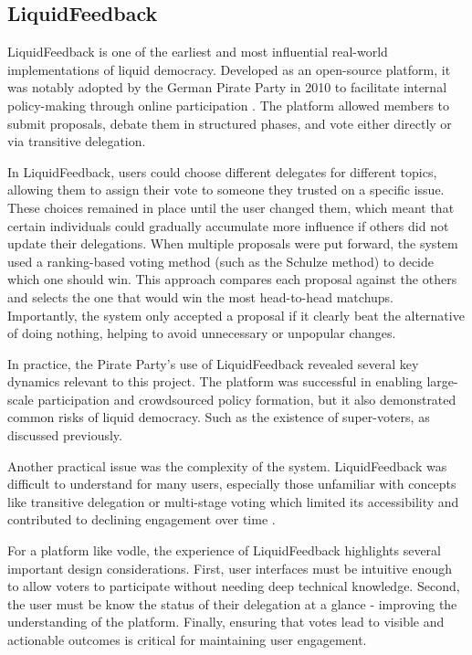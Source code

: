 \subsection{LiquidFeedback}
LiquidFeedback is one of the earliest and most influential real-world implementations of liquid democracy. Developed as an open-source platform, it was notably adopted by the German Pirate Party in 2010 to facilitate internal policy-making through online participation \citep{behrens_liquidfeedback_2014}. The platform allowed members to submit proposals, debate them in structured phases, and vote either directly or via transitive delegation.

In LiquidFeedback, users could choose different delegates for different topics, allowing them to assign their vote to someone they trusted on a specific issue. These choices remained in place until the user changed them, which meant that certain individuals could gradually accumulate more influence if others did not update their delegations. When multiple proposals were put forward, the system used a ranking-based voting method (such as the Schulze method) to decide which one should win. This approach compares each proposal against the others and selects the one that would win the most head-to-head matchups. Importantly, the system only accepted a proposal if it clearly beat the alternative of doing nothing, helping to avoid unnecessary or unpopular changes.

In practice, the Pirate Party's use of LiquidFeedback revealed several key dynamics relevant to this project. The platform was successful in enabling large-scale participation and crowdsourced policy formation, but it also demonstrated common risks of liquid democracy. Such as the existence of super-voters, as discussed previously.

Another practical issue was the complexity of the system. LiquidFeedback was difficult to understand for many users, especially those unfamiliar with concepts like transitive delegation or multi-stage voting which limited its accessibility and contributed to declining engagement over time \citep{kling2015votingbehaviourpoweronline}.

For a platform like vodle, the experience of LiquidFeedback highlights several important design considerations. First, user interfaces must be intuitive enough to allow voters to participate without needing deep technical knowledge. Second, the user must be know the status of their delegation at a glance - improving the understanding of the platform. Finally, ensuring that votes lead to visible and actionable outcomes is critical for maintaining user engagement.

